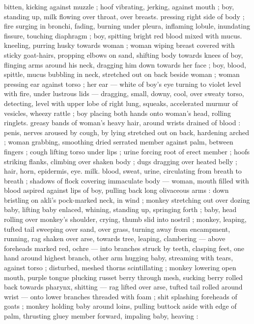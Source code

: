 bitten, kicking against muzzle ; hoof vibrating, jerking, against 
mouth ; boy, standing up, milk flowing over throat, over breasts. 
pressing right side of body ; fire surging in bronchi, fading, burning 
under pleura, inflaming lobule, inundating fissure, touching 
diaphragm ; boy, spitting bright red blood mixed with mucus. 
kneeling, purring husky towards woman ; woman wiping breast 
covered with sticky goat-hairs, propping elbows on sand, shifting 
body towards knees of boy, flinging arms around his neck, dragging 
him down towards her face ; boy, blood, spittle, mucus bubbling in 
neck, stretched out on back beside woman ; woman pressing ear 
against torso ; her ear --- white of boy's eye turning to violet level 
with fire, under lustrous lids --- dragging, small, downy, cool, over 
sweaty torso, detecting, level with upper lobe of right lung, squeaks, 
accelerated murmur of vesicles, wheezy rattle ; boy placing both 
hands onto woman's head, rolling ringlets. greasy bands of woman's 
heavy hair, around wrists drained of blood : penis, nerves aroused by 
cough, by lying stretched out on back, hardening arched ; woman 
grabbing, smoothing dried serrated member against palm, between 
fingers ; cough lifting torso under lips ; urine forcing root of erect 
member ; hoofs striking flanks, climbing over shaken body ; dugs 
dragging over heated belly ; hair, horn, epidermis, eye. milk. blood, 
sweat, urine, circulating from breath to breath ; shadows of flock 
covering immaculate body --- woman, mouth filled with blood aspired 
against lips of boy, pulling back long olivaceous arms : down bristling 
on akli's pock-marked neck, in wind ; monkey stretching out over 
dozing baby, lifting baby enlaced, whining, standing up, springing 
forth ; baby, head rolling over monkey's shoulder, crying, thumb slid 
into nostril ; monkey, leaping, tufted tail sweeping over sand, over 
grass, turning away from encampment, running, rag shaken over 
arse, towards tree, leaping, clambering --- above foreheads marked 
red, ochre --- into branches struck by teeth, clasping feet, one hand 
around highest branch, other arm hugging baby, streaming with 
tears, against torso ; disturbed, meshed thorns scintillating ; monkey 
lowering open mouth, purple tongue plucking russet berry through 
mesh, sucking berry rolled back towards pharynx, shitting --- rag 
lifted over arse, tufted tail rolled around wrist --- onto lower 
branches threaded with foam ; shit splashing foreheads of goats ; 
monkey holding baby around loins, pulling buttock aside with edge 
of palm, thrusting gluey member forward, impaling baby, heaving : 
